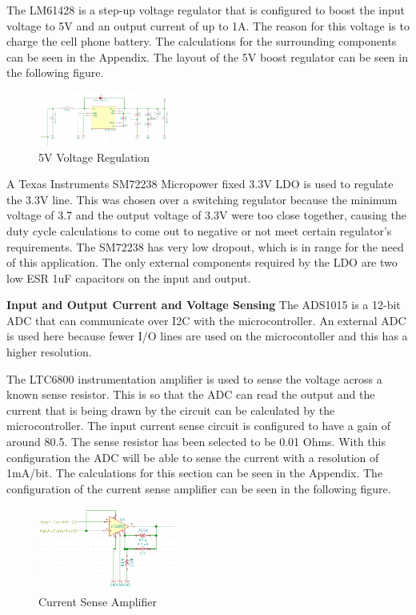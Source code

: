 \documentclass{article}
\begin{document}
{The LM61428 is a step-up voltage regulator that is configured to boost the input voltage to 5V and an output current of up to 1A. The reason for this voltage is to charge the cell phone battery.
The calculations for the surrounding components can be seen in the Appendix. The layout of the 5V boost regulator can be seen in the following figure.
\begin{figure}[H]
	\centering
	\includegraphics[width=0.4\textwidth]{PS5V}
	\caption{5V Voltage Regulation}
	\label{fig:ps5}
\end{figure}
A Texas Instruments SM72238 Micropower fixed 3.3V LDO is used to regulate the 3.3V line. This was chosen over a switching regulator because the minimum voltage of 3.7 and the output voltage of 3.3V were too close together, causing the duty cycle calculations to come out to negative or not meet certain regulator’s requirements. The SM72238 has very low dropout, which is in range for the need of this application. The only external components required by the LDO are two low ESR 1uF capacitors on the input and output. 

\textbf{Input and Output Current and Voltage Sensing}
The ADS1015 is a 12-bit ADC that can communicate over I2C with the microcontroller. An external ADC is used here because fewer I/O lines are used on the microcontoller and this has a higher resolution. 

The LTC6800 instrumentation amplifier is used to sense the voltage across a known sense resistor. This is so that the ADC can read the output and the current that is being drawn by the circuit can be calculated by the microcontroller. The input current sense circuit is configured to have a gain of around 80.5. The sense resistor has been selected to be 0.01 Ohms. With this configuration the ADC will be able to sense the current with a resolution of 1mA/bit. The calculations for this section can be seen in the Appendix. The configuration of the current sense amplifier can be seen in the following figure.
\begin{figure}[H]
	\centering
	\includegraphics[width=0.4\textwidth]{AtoV}
	\caption{Current Sense Amplifier}
	\label{fig:AV}
\end{figure}

}
\end{document}
